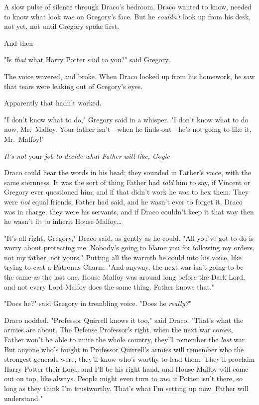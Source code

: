 A slow pulse of silence through Draco's bedroom. Draco wanted to know, needed 
to know what look was on Gregory's face. But he \emph{couldn't} look up from 
his desk, not yet, not until Gregory spoke first.

And then---

"Is \emph{that} what Harry Potter said to you?" said Gregory.

The voice wavered, and broke. When Draco looked up from his homework, he saw 
that tears were leaking out of Gregory's eyes.

Apparently that hadn't worked.

"I don't know what to do," Gregory said in a whisper. "I don't know what to do 
now, Mr.~Malfoy. Your father isn't---when he finds out---he's not going to like 
it, Mr.~Malfoy!"

\emph{It's not} your \emph{job to decide what Father will like, Goyle---}

Draco could hear the words in his head; they sounded in Father's voice, with 
the same sternness. It was the sort of thing Father had \emph{told} him to say, 
if Vincent or Gregory ever questioned him; and if that didn't work he was to 
hex them. They were \emph{not} equal friends, Father had said, and he wasn't 
ever to forget it. Draco was in charge, they were his servants, and if Draco 
couldn't keep it that way then he wasn't fit to inherit House Malfoy{\ldots}

"It's all right, Gregory," Draco said, as gently as he could. "All you've got 
to do is worry about protecting me. Nobody's going to blame you for following 
my orders, not my father, not yours." Putting all the warmth he could into his 
voice, like trying to cast a Patronus Charm. "And anyway, the next war isn't 
going to be the same as the last one. House Malfoy was around long before the 
Dark Lord, and not every Lord Malfoy does the same thing. Father knows that."

"Does he?" said Gregory in trembling voice. "Does he \emph{really?}"

Draco nodded. "Professor Quirrell knows it too," said Draco. "That's what the 
armies are about. The Defense Professor's right, when the next war comes, 
Father won't be able to unite the whole country, they'll remember the 
\emph{last} war. But anyone who's fought in Professor Quirrell's armies will 
remember who the strongest generals were, they'll know who's worthy to lead 
them. They'll proclaim Harry Potter their Lord, and I'll be his right hand, and 
House Malfoy will come out on top, like always. People might even turn to 
\emph{me,} if Potter isn't there, so long as they think I'm trustworthy. That's 
what I'm setting up now. Father will understand."

